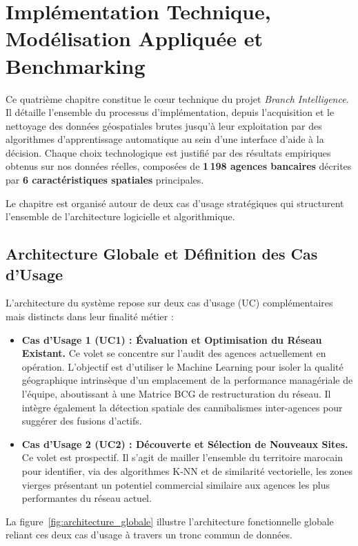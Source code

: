 
\chapter{Implémentation Technique, Modélisation Appliquée et Benchmarking}

Ce quatrième chapitre constitue le cœur technique du projet \textit{Branch Intelligence}. Il détaille l'ensemble du processus d'implémentation, depuis l'acquisition et le nettoyage des données géospatiales brutes jusqu'à leur exploitation par des algorithmes d'apprentissage automatique au sein d'une interface d'aide à la décision. Chaque choix technologique est justifié par des résultats empiriques obtenus sur nos données réelles, composées de \textbf{1\,198 agences bancaires} décrites par \textbf{6 caractéristiques spatiales} principales.

Le chapitre est organisé autour de deux cas d'usage stratégiques qui structurent l'ensemble de l'architecture logicielle et algorithmique.

\section{Architecture Globale et Définition des Cas d'Usage}

L'architecture du système repose sur deux cas d'usage (UC) complémentaires mais distincts dans leur finalité métier :

\begin{itemize}
    \item \textbf{Cas d'Usage 1 (UC1) : Évaluation et Optimisation du Réseau Existant.} Ce volet se concentre sur l'audit des agences actuellement en opération. L'objectif est d'utiliser le Machine Learning pour isoler la qualité géographique intrinsèque d'un emplacement de la performance managériale de l'équipe, aboutissant à une Matrice BCG de restructuration du réseau. Il intègre également la détection spatiale des cannibalismes inter-agences pour suggérer des fusions d'actifs.
    \item \textbf{Cas d'Usage 2 (UC2) : Découverte et Sélection de Nouveaux Sites.} Ce volet est prospectif. Il s'agit de mailler l'ensemble du territoire marocain pour identifier, via des algorithmes K-NN et de similarité vectorielle, les zones vierges présentant un potentiel commercial similaire aux agences les plus performantes du réseau actuel.
\end{itemize}

La figure~\ref{fig:architecture_globale} illustre l'architecture fonctionnelle globale reliant ces deux cas d'usage à travers un tronc commun de données.

